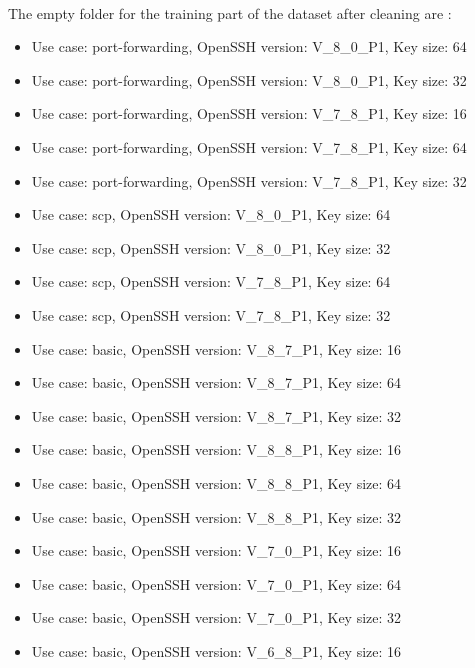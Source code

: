         \paragraph{}The empty folder for the training part of the dataset after cleaning are : 
        \begin{itemize}
            \item Use case: port-forwarding, OpenSSH version: V\_8\_0\_P1, Key size: 64
            \item Use case: port-forwarding, OpenSSH version: V\_8\_0\_P1, Key size: 32
            \item Use case: port-forwarding, OpenSSH version: V\_7\_8\_P1, Key size: 16
            \item Use case: port-forwarding, OpenSSH version: V\_7\_8\_P1, Key size: 64
            \item Use case: port-forwarding, OpenSSH version: V\_7\_8\_P1, Key size: 32
            \item Use case: scp, OpenSSH version: V\_8\_0\_P1, Key size: 64
            \item Use case: scp, OpenSSH version: V\_8\_0\_P1, Key size: 32
            \item Use case: scp, OpenSSH version: V\_7\_8\_P1, Key size: 64
            \item Use case: scp, OpenSSH version: V\_7\_8\_P1, Key size: 32
            \item Use case: basic, OpenSSH version: V\_8\_7\_P1, Key size: 16
            \item Use case: basic, OpenSSH version: V\_8\_7\_P1, Key size: 64
            \item Use case: basic, OpenSSH version: V\_8\_7\_P1, Key size: 32
            \item Use case: basic, OpenSSH version: V\_8\_8\_P1, Key size: 16
            \item Use case: basic, OpenSSH version: V\_8\_8\_P1, Key size: 64
            \item Use case: basic, OpenSSH version: V\_8\_8\_P1, Key size: 32
            \item Use case: basic, OpenSSH version: V\_7\_0\_P1, Key size: 16
            \item Use case: basic, OpenSSH version: V\_7\_0\_P1, Key size: 64
            \item Use case: basic, OpenSSH version: V\_7\_0\_P1, Key size: 32
            \item Use case: basic, OpenSSH version: V\_6\_8\_P1, Key size: 16

\end{itemize}

